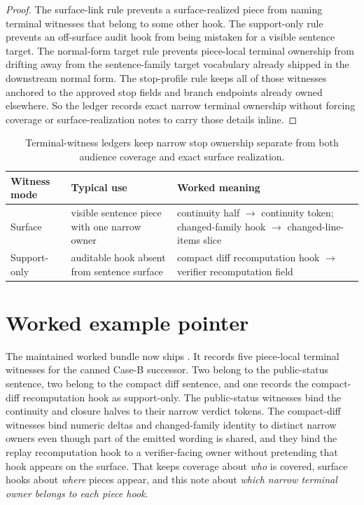 \documentclass[11pt]{article}
\begin{document}
\begin{proof}
The surface-link rule prevents a surface-realized piece from naming terminal witnesses that belong to some other hook.
The support-only rule prevents an off-surface audit hook from being mistaken for a visible sentence target.
The normal-form target rule prevents piece-local terminal ownership from drifting away from the sentence-family target vocabulary already shipped in the downstream normal form.
The stop-profile rule keeps all of those witnesses anchored to the approved stop fields and branch endpoints already owned elsewhere.
So the ledger records exact narrow terminal ownership without forcing coverage or surface-realization notes to carry those details inline.
\end{proof}

\begin{table}[t]
\centering
\small
\begin{tabularx}{\linewidth}{@{}l l X@{}}
\toprule
Witness mode & Typical use & Worked meaning \\
\midrule
Surface & visible sentence piece with one narrow owner & continuity half $\to$ continuity token; changed-family hook $\to$ changed-line-items slice \\
Support-only & auditable hook absent from sentence surface & compact diff recomputation hook $\to$ verifier recomputation field \\
\bottomrule
\end{tabularx}
\caption{Terminal-witness ledgers keep narrow stop ownership separate from both audience coverage and exact surface realization.}
\label{tab:terminalwitnesses}
\end{table}

\section{Worked example pointer}
The maintained worked bundle now ships .\cite{series:workedexample}
It records five piece-local terminal witnesses for the canned Case-B successor.
Two belong to the public-status sentence, two belong to the compact diff sentence, and one records the compact-diff recomputation hook as support-only.
The public-status witnesses bind the continuity and closure halves to their narrow verdict tokens.
The compact-diff witnesses bind numeric deltas and changed-family identity to distinct narrow owners even though part of the emitted wording is shared, and they bind the replay recomputation hook to a verifier-facing owner without pretending that hook appears on the surface.
That keeps coverage about \emph{who} is covered, surface hooks about \emph{where} pieces appear, and this note about \emph{which narrow terminal owner belongs to each piece hook}.\cite{series:challengecoverage,series:challengesurfacehooks}
\end{document}

